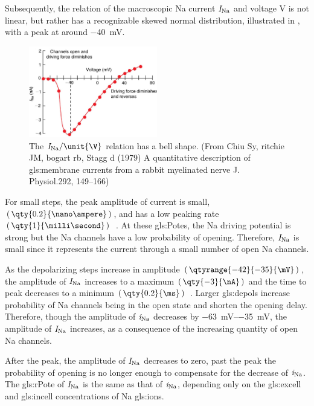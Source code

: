 \documentclass[class={myRUCProject}, crop=false]{standalone}
\begin{document}
Subsequently, the relation of the macroscopic \gls{Na} current \(\mathit{I}_\mathrm{Na}\) and voltage \(\unit{\V}\) is not linear, but rather has a recognizable skewed normal distribution, illustrated in , with a peak at around \qty{-40}{\mV}. 
\begin{figure}[H]
  \centering
  \includegraphics[width=0.5\textwidth]{Pictures//Anakin/I-V.bell.png}
  \caption{The \(\curr\sodium/\unit{\V}\) relation has a bell shape. (From Chiu Sy, ritchie JM, bogart rb, Stagg d (1979) A quantitative description of \gls{gls:membrane} currents from a rabbit myelinated nerve J. Physiol.292, 149–166)}\label{fig:IVdist.}
\end{figure}
 
For small steps, the peak amplitude of current is small, \(\br{\qty{0.2}{\nano\ampere}}\), and has a low peaking rate \(\br{\qty{1}{\milli\second}}\)~\cite{Hammond2015ch4}. At these \glspl{gls:Pote}, the \gls{Na} driving potential is strong but the \gls{Na} channels have a low probability of opening. Therefore, \(\mathit{I}_\mathrm{Na}\) is small since it represents the current through a small number of open \gls{Na} channels. 

As the depolarizing steps increase in amplitude \(\br{\qtyrange{-42}{-35}{\mV}}\), the amplitude of \(\mathit{I}_\mathrm{Na}\) increases to a maximum \(\br{\qty{-3}{\nA}}\) and the time to peak decreases to a minimum \(\br{\qty{0.2}{\ms}}\)~\cite{Hammond2015ch4}. 
Larger \glspl{gls:depol} increase probability of \gls{Na} channels being in the open state and shorten the opening delay. 
Therefore, though the amplitude of \(\mathit{i}_\mathrm{Na}\) decreases by \qtyrange{-63}{-35}{\mV}, the amplitude of \(\mathit{I}_\mathrm{Na}\) increases, as a consequence of the increasing quantity of open \gls{Na} channels. 

After the peak, the amplitude of \(\mathit{I}_\mathrm{Na}\) decreases to zero, past the peak the probability of opening is no longer enough to compensate for the decrease of \(\mathit{i}_\mathrm{Na}\). 
The \gls{gls:rPote} of \(\mathit{I}_\mathrm{Na}\) is the same as that of \(\mathit{i}_\mathrm{Na}\), depending only on the \gls{gls:excell} and \gls{gls:incell} concentrations of \gls{Na} \glspl{gls:ion}.
\end{document}
